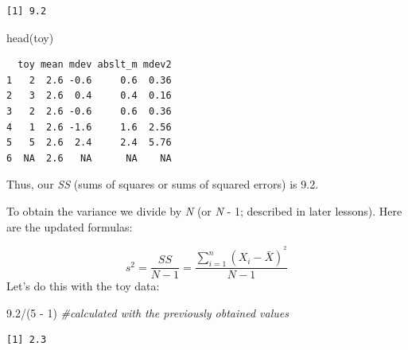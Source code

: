 \documentclass[
  11pt,
]{book}
\newenvironment{Shaded}{\begin{snugshade}}{\end{snugshade}}
\newcommand{\AttributeTok}[1]{\textcolor[rgb]{0.77,0.63,0.00}{#1}}
\newcommand{\CommentTok}[1]{\textcolor[rgb]{0.56,0.35,0.01}{\textit{#1}}}
\newcommand{\ConstantTok}[1]{\textcolor[rgb]{0.00,0.00,0.00}{#1}}
\newcommand{\DecValTok}[1]{\textcolor[rgb]{0.00,0.00,0.81}{#1}}
\newcommand{\FloatTok}[1]{\textcolor[rgb]{0.00,0.00,0.81}{#1}}
\newcommand{\FunctionTok}[1]{\textcolor[rgb]{0.00,0.00,0.00}{#1}}
\newcommand{\NormalTok}[1]{#1}
\newcommand{\OtherTok}[1]{\textcolor[rgb]{0.56,0.35,0.01}{#1}}
\newcommand{\SpecialCharTok}[1]{\textcolor[rgb]{0.00,0.00,0.00}{#1}}
\begin{document}
\begin{verbatim}
[1] 9.2
\end{verbatim}

\begin{Shaded}
\begin{Highlighting}[]
\FunctionTok{head}\NormalTok{(toy)}
\end{Highlighting}
\end{Shaded}

\begin{verbatim}
  toy mean mdev abslt_m mdev2
1   2  2.6 -0.6     0.6  0.36
2   3  2.6  0.4     0.4  0.16
3   2  2.6 -0.6     0.6  0.36
4   1  2.6 -1.6     1.6  2.56
5   5  2.6  2.4     2.4  5.76
6  NA  2.6   NA      NA    NA
\end{verbatim}

Thus, our \emph{SS} (sums of squares or sums of squared errors) is 9.2.

To obtain the variance we divide by \emph{N} (or \emph{N} - 1; described in later lessons). Here are the updated formulas:

\[s^{2}=\frac{SS}{N-1}=\frac{\sum_{i=1}^{n}(X_{i} - \bar{X})^{^{2}}}{N-1}\]
Let's do this with the toy data:

\begin{Shaded}
\begin{Highlighting}[]
\FloatTok{9.2}\SpecialCharTok{/}\NormalTok{(}\DecValTok{5} \SpecialCharTok{{-}} \DecValTok{1}\NormalTok{)  }\CommentTok{\#calculated with the previously obtained values}
\end{Highlighting}
\end{Shaded}

\begin{verbatim}
[1] 2.3
\end{verbatim}

\begin{Shaded}
\end{Shaded}
\end{document}
